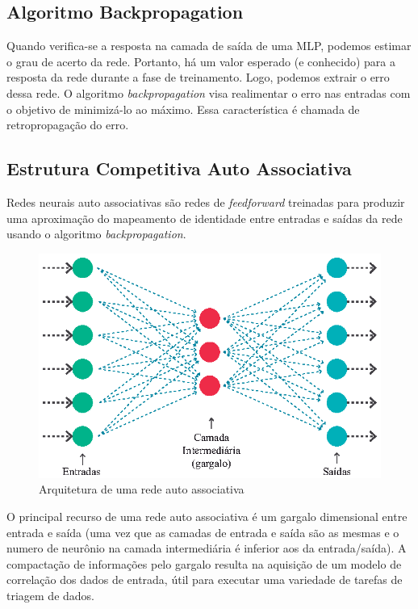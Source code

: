 \subsection{Algoritmo Backpropagation}


Quando verifica-se a resposta na camada de saída de uma MLP, podemos estimar o grau de acerto da rede. Portanto, há um valor esperado (e conhecido) para a resposta da rede durante a fase de treinamento. Logo, podemos extrair o erro dessa rede. O algoritmo \textit{backpropagation} visa realimentar o erro nas entradas com o objetivo de minimizá-lo ao máximo. Essa característica é chamada de retropropagação do erro.

\subsection{Estrutura Competitiva Auto Associativa}

Redes neurais auto associativas são redes de \textit{feedforward} treinadas para produzir uma aproximação do mapeamento de identidade entre entradas e saídas da rede usando o algoritmo \textit{backpropagation}.

\begin{figure}[H]

\centering %
\includegraphics{04-Figuras/associativa}

\caption{Arquitetura de uma rede auto associativa}

\label{figura:associativa}

\end{figure}

O principal recurso de uma rede auto associativa é um gargalo dimensional entre entrada e saída (uma vez que as camadas de entrada e saída são as mesmas e o numero de neurônio na camada intermediária é inferior aos da entrada/saída). A compactação de informações pelo gargalo resulta na aquisição de um modelo de correlação dos dados de entrada, útil para executar uma variedade de tarefas de triagem de dados.


